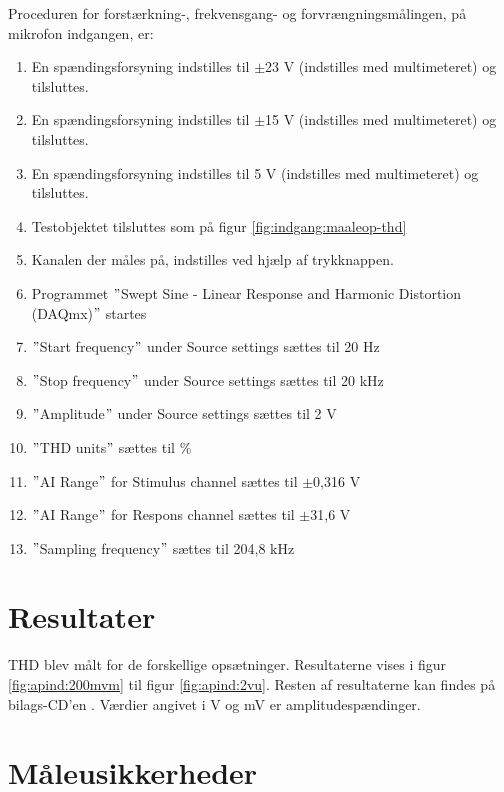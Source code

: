 Proceduren for forstærkning-, frekvensgang- og forvrængningsmålingen, på mikrofon indgangen, er:

\begin{enumerate}
\item En spændingsforsyning indstilles til $\pm$23 V (indstilles med multimeteret) og tilsluttes.
\item En spændingsforsyning indstilles til $\pm$15 V (indstilles med multimeteret) og tilsluttes.
\item En spændingsforsyning indstilles til 5 V (indstilles med multimeteret) og tilsluttes.
\item Testobjektet tilsluttes som på figur \ref{fig:indgang:maaleop-thd}
\item Kanalen der måles på, indstilles ved hjælp af trykknappen.
\item Programmet $"$Swept Sine - Linear Response and Harmonic Distortion (DAQmx)$"$ startes
\item $"$Start frequency$"$ under Source settings sættes til 20 Hz
\item $"$Stop frequency$"$ under Source settings sættes til 20 kHz
\item $"$Amplitude$"$ under Source settings sættes til 2 V
\item $"$THD units$"$ sættes til \%
\item $"$AI Range$"$ for Stimulus channel sættes til $\pm$0,316 V
\item $"$AI Range$"$ for Respons channel sættes til $\pm$31,6 V
\item $"$Sampling frequency$"$ sættes til 204,8 kHz
\end{enumerate}

\section*{Resultater}

THD blev målt for de forskellige opsætninger. Resultaterne vises i figur \ref{fig:apind:200mvm} til figur \ref{fig:apind:2vu}. Resten af resultaterne kan findes på bilags-CD'en \cite{hifi-forstaerker-maalinng}. Værdier angivet i V og mV er amplitudespændinger.

\section*{Måleusikkerheder}